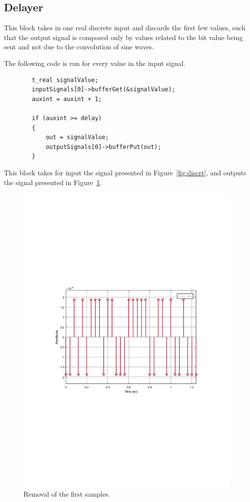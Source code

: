 \documentclass{article}
\begin{document}
\subsection{Delayer}

This block takes in one real discrete input and discards the first few values, such that the output signal is composed only by values related to the bit value being sent and not due to the convolution of sine waves.
\par
The following code is run for every value in the input signal.
\begin{verbatim}
		t_real signalValue;
		inputSignals[0]->bufferGet(&signalValue);
		auxint = auxint + 1;

		if (auxint >= delay)
		{
			out = signalValue;
			outputSignals[0]->bufferPut(out);
		}
\end{verbatim}

This block takes for input the signal presented in Figure~\ref{fig:discrt}, and outputs the signal presented in Figure~\ref{fig:delay}.

\begin{figure}[H]
\centering
\includegraphics[width=\linewidth, trim= 0mm 100mm 0mm 100mm, clip]{delayed.pdf}
\caption{Removal of the first samples.}
\label{fig:delay}
\end{figure}
\end{document}
